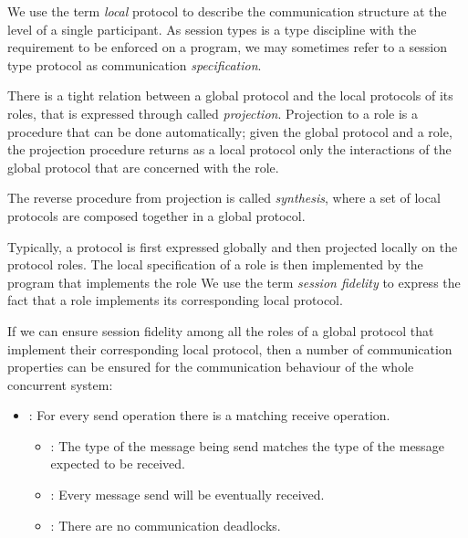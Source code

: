 
We use the term {\em local} protocol to describe
the communication structure at the level of a single participant.
As session types is a type discipline with the requirement to
be enforced on a program, we may sometimes refer to a session type
protocol as communication {\em specification}.

\begin{comment}
For example Scribble code:
%
\begin{lstlisting}
  msg(int) from A to B;
\end{lstlisting}
%
describes the global protocol between role \lstinline|A| and \lstinline|B|,
where participant \lstinline|A| sends message of type \lstinline|msg(int)|
to participant \lstinline|B|. From the local perspective of participant
\lstinline|A| the protocol would be:
%
\begin{lstlisting}
  msg(int) to B;
\end{lstlisting}
%
where it describes the sending of message \lstinline|msg(int)|
to participant \lstinline|B|.
\end{comment}

There is a tight relation between a global protocol and the
local protocols of its roles, that is expressed
through called {\em projection}.
Projection to a role is a procedure that can be done automatically;
given the global protocol and a role, the projection 
procedure returns as a local protocol only the
interactions of the global protocol that are concerned with
the role.

The reverse procedure from projection is called {\em synthesis},
where a set of local protocols are composed together in a global
protocol.

Typically, a protocol is first expressed globally and then
projected locally on the protocol roles.
The local specification of a role is then
implemented by the program that implements the role
We use the term {\em session fidelity} to express the fact
that a role implements its corresponding local protocol.

If we can ensure session fidelity among all the roles of a
global protocol that implement their corresponding local protocol,
then a number of communication properties can be ensured
for the communication behaviour of the whole concurrent
system:
\begin{itemize}
	\item	{\em }:	For every send operation there is a matching receive operation.
	\begin{itemize}
		\item	{\em }: The type of the message being send matches the type of
						the message expected to be received.
		\item	{\em }:	Every message send will be eventually received.
		\item	{\em }: There are no communication deadlocks.
	\end{itemize}

\end{itemize}


